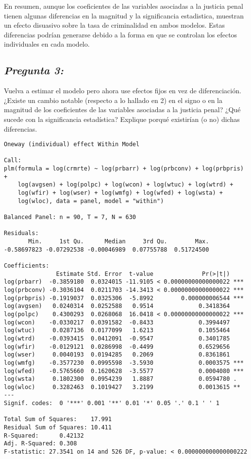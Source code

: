 \documentclass[
  12pt,
]{article}
\begin{document}
En resumen, aunque los coeficientes de las variables asociadas a la
justicia penal tienen algunas diferencias en la magnitud y la
significancia estadistica, muestran un efecto disuasivo sobre la tasa de
criminalidad en ambos modelos. Estas diferencias podrían generarse
debido a la forma en que se controlan los efectos individuales en cada
modelo.

\subsection{\texorpdfstring{\textbf{\emph{Pregunta
3:}}}{Pregunta 3:}}\label{pregunta-3}

Vuelva a estimar el modelo pero ahora use efectos fijos en vez de
diferenciación. ¿Existe un cambio notable (respecto a lo hallado en 2)
en el signo o en la magnitud de los coeficientes de las variables
asociadas a la justicia penal? ¿Qué sucede con la significancia
estadística? Explique porqué existirían (o no) dichas diferencias.

\begin{verbatim}
Oneway (individual) effect Within Model

Call:
plm(formula = log(crmrte) ~ log(prbarr) + log(prbconv) + log(prbpris) + 
    log(avgsen) + log(polpc) + log(wcon) + log(wtuc) + log(wtrd) + 
    log(wfir) + log(wser) + log(wmfg) + log(wfed) + log(wsta) + 
    log(wloc), data = panel, model = "within")

Balanced Panel: n = 90, T = 7, N = 630

Residuals:
       Min.     1st Qu.      Median     3rd Qu.        Max. 
-0.58697823 -0.07292538 -0.00046989  0.07755788  0.51724500 

Coefficients:
               Estimate Std. Error  t-value              Pr(>|t|)    
log(prbarr)  -0.3859180  0.0324015 -11.9105 < 0.00000000000000022 ***
log(prbconv) -0.3036104  0.0211703 -14.3413 < 0.00000000000000022 ***
log(prbpris) -0.1919037  0.0325306  -5.8992        0.000000006544 ***
log(avgsen)   0.0240314  0.0252588   0.9514             0.3418364    
log(polpc)    0.4300293  0.0268068  16.0418 < 0.00000000000000022 ***
log(wcon)    -0.0330217  0.0391582  -0.8433             0.3994497    
log(wtuc)     0.0287136  0.0177099   1.6213             0.1055464    
log(wtrd)    -0.0393415  0.0412091  -0.9547             0.3401785    
log(wfir)    -0.0129121  0.0286998  -0.4499             0.6529656    
log(wser)     0.0040193  0.0194285   0.2069             0.8361861    
log(wmfg)    -0.3577230  0.0995598  -3.5930             0.0003575 ***
log(wfed)    -0.5765660  0.1620628  -3.5577             0.0004080 ***
log(wsta)     0.1802300  0.0954239   1.8887             0.0594780 .  
log(wloc)     0.3282463  0.1019427   3.2199             0.0013615 ** 
---
Signif. codes:  0 '***' 0.001 '**' 0.01 '*' 0.05 '.' 0.1 ' ' 1

Total Sum of Squares:    17.991
Residual Sum of Squares: 10.411
R-Squared:      0.42132
Adj. R-Squared: 0.308
F-statistic: 27.3541 on 14 and 526 DF, p-value: < 0.000000000000000222
\end{verbatim}
\end{document}
